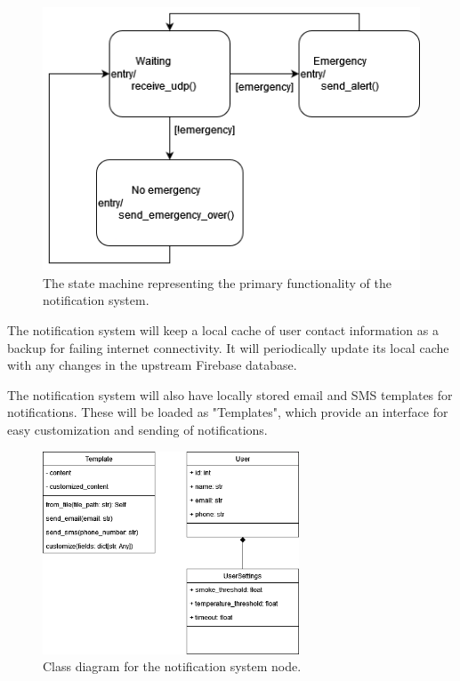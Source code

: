 \begin{figure}[H]
    \centering
    \includegraphics[width=\linewidth]{../assets/NotificationSystemStateMachine.png}
    \caption{The state machine representing the primary functionality of the notification system.}
\end{figure}

The notification system will keep a local cache of user contact information as a backup for failing internet
connectivity. It will periodically update its local cache with any changes in the upstream Firebase database.

The notification system will also have locally stored email and SMS templates for notifications. These will be loaded
as "Templates", which provide an interface for easy customization and sending of notifications.

\begin{figure}[H]
    \centering
    \includegraphics[width=3in]{../assets/NotificationSystemClassDiagram.png}
    \caption{Class diagram for the notification system node.}
\end{figure}


